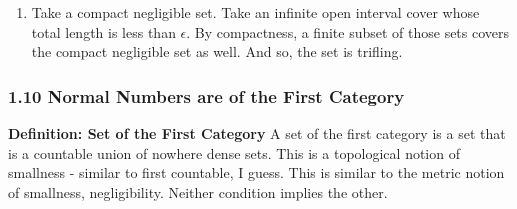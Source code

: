 \documentclass[12pt,a4paper]{article}
\newcommand{\1}[1]{\mathbbm{1}\left\{ #1 \right\}}
\begin{document}
\begin{enumerate}
	\item Take a compact negligible set. Take an infinite open interval cover whose total length is less than $\epsilon$. By compactness, a finite subset of those sets covers the compact negligible set as well. And so, the set is trifling.
\end{enumerate}

\subsubsection{1.10 Normal Numbers are of the First Category} \textbf{Definition: Set of the First Category} A set of the first category is a set that is a countable union of nowhere dense sets. This is a topological notion of smallness - similar to first countable, I guess. This is similar to the metric notion of smallness, negligibility. Neither condition implies the other.
\end{document}
